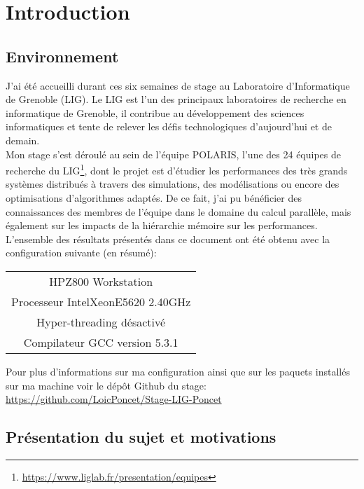 \chapter{Introduction}


\section{Environnement}

J'ai été accueilli durant ces six semaines de stage au Laboratoire d'Informatique de Grenoble (LIG). Le LIG est l'un des principaux laboratoires de recherche en informatique de Grenoble, il contribue au développement des sciences informatiques et tente de relever les défis technologiques d'aujourd'hui et de demain.\\

Mon stage s'est déroulé au sein de l'équipe POLARIS, l'une des 24 équipes de recherche du LIG\footnote{\url{https://www.liglab.fr/presentation/equipes}},  dont le projet est d'étudier les performances des très grands systèmes distribués à travers des simulations, des modélisations ou encore des optimisations d'algorithmes adaptés. De ce fait, j'ai pu bénéficier des connaissances des membres de l'équipe dans le domaine du calcul parallèle, mais également sur les impacts de la hiérarchie mémoire sur les performances.\\

L'ensemble des résultats présentés dans ce document ont été obtenu avec la configuration suivante (en résumé):

\begin{center}
\begin{tabular}{|c|}
\hline
	HP\textsuperscript\textregistered Z800 Workstation \\
	Processeur Intel\textsuperscript\textregistered Xeon\textsuperscript\textregistered  		E5620 2.40GHz \cite{proc}\\
	Hyper-threading désactivé\\
	Compilateur GCC version 5.3.1 \\
\hline
\end{tabular}
\end{center}

Pour plus d'informations sur ma configuration ainsi que sur les paquets installés sur ma machine voir le dépôt Github du stage: \url{https://github.com/LoicPoncet/Stage-LIG-Poncet}

\section{Présentation du sujet et motivations}

